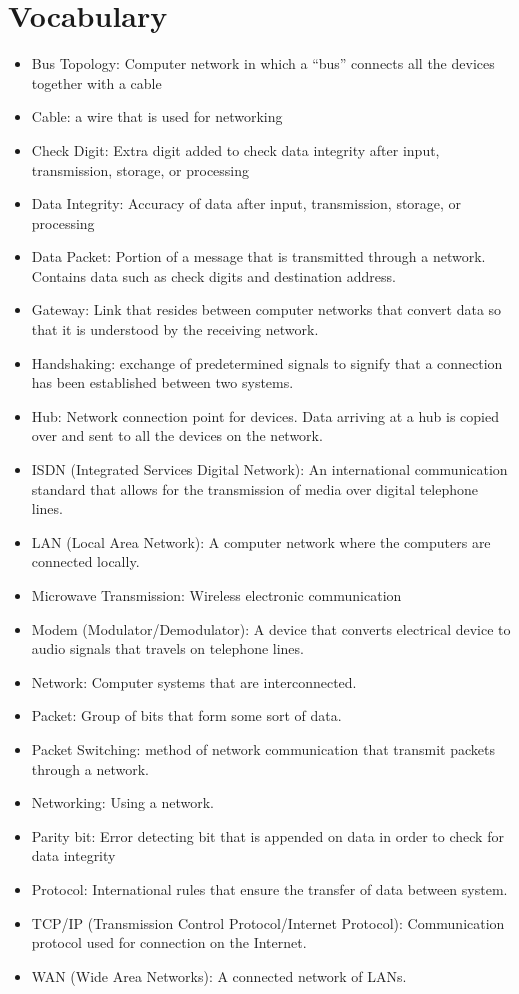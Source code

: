 \documentclass[../notes.tex]{subfiles}
\begin{document}
	
\section*{Vocabulary}
\begin{itemize}
	\item Bus Topology: Computer network in which a ``bus'' connects all the devices together with a cable
	\item Cable: a wire that is used for networking
	\item Check Digit: Extra digit added to check data integrity after input, transmission, storage, or processing
	\item Data Integrity: Accuracy of data after input, transmission, storage, or processing
	\item Data Packet: Portion of a message that is transmitted through a network. Contains data such as check digits and destination address.
	\item Gateway: Link that resides between computer networks that convert data so that it is understood by the receiving network.
	\item Handshaking: exchange of predetermined signals to signify that a connection has been established between two systems.
	\item Hub: Network connection point for devices. Data arriving at a hub is copied over and sent to all the devices on the network.
	\item ISDN (Integrated Services Digital Network): An international communication standard that allows for the transmission of media over digital telephone lines.
	\item LAN (Local Area Network): A computer network where the computers are connected locally. 
	\item Microwave Transmission: Wireless electronic communication
	\item Modem (Modulator/Demodulator): A device that converts electrical device to audio signals that travels on telephone lines.
	\item Network: Computer systems that are interconnected. 
	\item Packet: Group of bits that form some sort of data. 
	\item Packet Switching: method of network communication that transmit packets through a network.
	\item Networking: Using a network. 
	\item Parity bit: Error detecting bit that is appended on data in order to check for data integrity
	\item Protocol: International rules that ensure the transfer of data between system.
	\item TCP/IP (Transmission Control Protocol/Internet Protocol): Communication protocol used for connection on the Internet.
	\item WAN (Wide Area Networks): A connected network of LANs.
\end{itemize}
\end{document}
